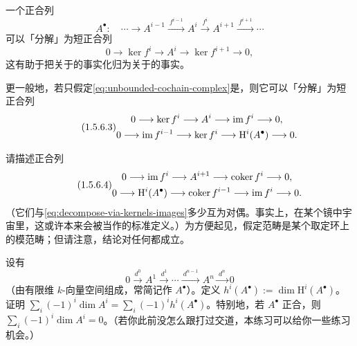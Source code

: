 一个正合列
\begin{equation*}\tag{1.5.6.2}\label{eq:unbounded-cochain-complex}
A^{\bullet}\colon\quad\cdots\longrightarrow A^{i-1}\mathrel{\xrightarrow{\ f^{i-1}\ }}A^{i}\mathrel{\xrightarrow{\ f^{i}\ }}A^{i+1}\mathrel{\xrightarrow{\ f^{i+1}\ }}\cdots
\end{equation*}
可以「分解」为短正合列
\[
0\longrightarrow\ker f^{i}\longrightarrow A^{i}\longrightarrow\ker f^{i+1}\longrightarrow 0,
\]
这有助于把关于\trLongExactSequence{}的事实化归为关于\trShortExactSequence{}的事实。

更一般地，若只假定\eqref{eq:unbounded-cochain-complex}是\trComplexN，则它可以「分解」为短正合列
\begin{equation*}\tag{1.5.6.3}\label{eq:decompose-via-kernels-images}
\begin{gathered}
0\longrightarrow\ker f^{i}\longrightarrow A^{i}\longrightarrow\operatorname{im} f^{i}\longrightarrow 0,\\
0\longrightarrow\operatorname{im} f^{i-1}\longrightarrow\ker f^{i}\longrightarrow\mathrm{H}^{i}(A^{\bullet})\longrightarrow 0.
\end{gathered}
\end{equation*}

\begin{exercise}\label{ex:splitting-into-short-exact-sequences}
请描述正合列
\begin{equation*}\tag{1.5.6.4}\label{eq:dual-splitting-sequences}
\begin{gathered}
0\longrightarrow\operatorname{im} f^{i}\longrightarrow A^{i+1}\longrightarrow\operatorname{coker} f^{i}\longrightarrow 0,\\
0\longrightarrow\mathrm{H}^{i}(A^{\bullet})\longrightarrow\operatorname{coker} f^{i-1}\longrightarrow\operatorname{im} f^{i}\longrightarrow 0.
\end{gathered}
\end{equation*}
（它们与\eqref{eq:decompose-via-kernels-images}多少互为对偶。事实上，在某个镜中宇宙里，这或许本来会被当作\trHomology{}的标准定义。）为方便起见，假定范畴是某个取定环上的模范畴；但请注意，结论对任何\trAbelianCategory{}都成立。
\end{exercise}

\begin{exercise}[兼重要定义]\label{ex:euler-characteristic-finite-complexes}
设有\trComplexN
\[
0\mathrel{\xrightarrow{\ d^{0}\ }}A^{1}\mathrel{\xrightarrow{\ d^{1}\ }}\cdots\mathrel{\xrightarrow{\ d^{n-1}\ }}A^{n}\mathrel{\xrightarrow{\ d^{n}\ }}0
\]
（由有限维 $k$-向量空间组成，常简记作 $A^{\bullet}$）。定义 $h^{i}(A^{\bullet}):=\dim\mathrm{H}^{i}(A^{\bullet})$。证明 $\sum_i(-1)^{i}\dim A^{i}=\sum_i(-1)^{i}h^{i}(A^{\bullet})$。特别地，若 $A^{\bullet}$ 正合，则 $\sum_i(-1)^{i}\dim A^{i}=0$。（若你此前没怎么跟\trCohomology{}打过交道，本练习可以给你一些练习机会。）
\end{exercise}

